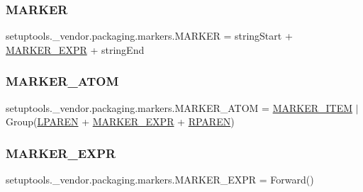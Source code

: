\subsubsection{\texorpdfstring{M\+A\+R\+K\+ER}{MARKER}}
{\footnotesize\ttfamily setuptools.\+\_\+vendor.\+packaging.\+markers.\+M\+A\+R\+K\+ER = string\+Start + \hyperlink{namespacesetuptools_1_1__vendor_1_1packaging_1_1markers_ab9cab017631765e5f92c71c6e9a7040d}{M\+A\+R\+K\+E\+R\+\_\+\+E\+X\+PR} + string\+End}

\mbox{\label{namespacesetuptools_1_1__vendor_1_1packaging_1_1markers_a61c041105dd50e8df4fa82ca8a24e165}} 
\subsubsection{\texorpdfstring{M\+A\+R\+K\+E\+R\+\_\+\+A\+T\+OM}{MARKER\_ATOM}}
{\footnotesize\ttfamily setuptools.\+\_\+vendor.\+packaging.\+markers.\+M\+A\+R\+K\+E\+R\+\_\+\+A\+T\+OM = \hyperlink{namespacesetuptools_1_1__vendor_1_1packaging_1_1markers_a09f5a22d9147ab9be7a6fbd993a28025}{M\+A\+R\+K\+E\+R\+\_\+\+I\+T\+EM} $\vert$ Group(\hyperlink{namespacesetuptools_1_1__vendor_1_1packaging_1_1markers_a3ebc8206e3652278c8b679f53f63b808}{L\+P\+A\+R\+EN} + \hyperlink{namespacesetuptools_1_1__vendor_1_1packaging_1_1markers_ab9cab017631765e5f92c71c6e9a7040d}{M\+A\+R\+K\+E\+R\+\_\+\+E\+X\+PR} + \hyperlink{namespacesetuptools_1_1__vendor_1_1packaging_1_1markers_a7931171c32f82d5b17dd05dbd6898ae1}{R\+P\+A\+R\+EN})}

\mbox{\label{namespacesetuptools_1_1__vendor_1_1packaging_1_1markers_ab9cab017631765e5f92c71c6e9a7040d}} 
\subsubsection{\texorpdfstring{M\+A\+R\+K\+E\+R\+\_\+\+E\+X\+PR}{MARKER\_EXPR}}
{\footnotesize\ttfamily setuptools.\+\_\+vendor.\+packaging.\+markers.\+M\+A\+R\+K\+E\+R\+\_\+\+E\+X\+PR = Forward()}

